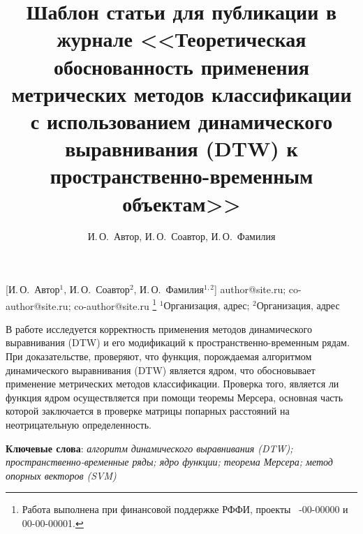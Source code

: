 \documentclass[12pt, twoside]{article}
\begin{document}
\title
    [Шаблон статьи для публикации] %
    {Шаблон статьи для публикации в журнале <<Теоретическая обоснованность применения метрических методов классификации с использованием динамического выравнивания (DTW) к пространственно-временным объектам>>}
\author
    [И.\,О.~Автор] %
    {И.\,О.~Автор, И.\,О.~Соавтор, И.\,О.~Фамилия} %
    [И.\,О.~Автор$^1$, И.\,О.~Соавтор$^2$, И.\,О.~Фамилия$^{1,2}$] %
\email
    {author@site.ru; co-author@site.ru;  co-author@site.ru}
\thanks
    {Работа выполнена при
     финансовой поддержке РФФИ, проекты \No\ -00-00000 и 00-00-00001.}
\organization
    {$^1$Организация, адрес; $^2$Организация, адрес}
\abstract
    {В работе исследуется корректность применения методов динамического выравнивания (DTW) и его модификаций к пространственно-временным рядам. При доказательстве, проверяют, что функция, порождаемая алгоритмом динамического выравнивания (DTW) является ядром, что обосновывает применение метрических методов классификации. Проверка того, является ли функция ядром осуществляется при помощи теоремы Мерсера, основная часть которой заключается в проверке матрицы попарных расстояний на неотрицательную определенность. 
	
\bigskip
\noindent
\textbf{Ключевые слова}: \emph {алгоритм динамического выравнивания (DTW); пространственно-временные ряды; ядро функции; теорема Мерсера; метод опорных векторов (SVM)}
}



\maketitle
\linenumbers
\end{document}
